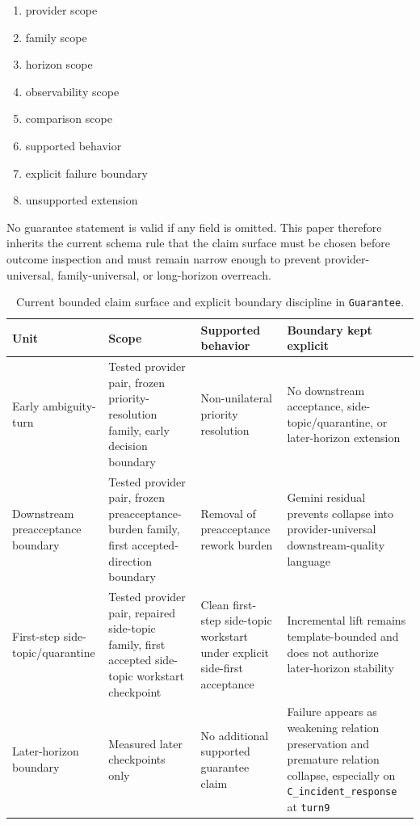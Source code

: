 \documentclass[11pt]{article}
\begin{document}
\begin{enumerate}
\item provider scope
\item family scope
\item horizon scope
\item observability scope
\item comparison scope
\item supported behavior
\item explicit failure boundary
\item unsupported extension
\end{enumerate}

No guarantee statement is valid if any field is omitted. This paper therefore
inherits the current schema rule that the claim surface must be chosen before
outcome inspection and must remain narrow enough to prevent provider-universal,
family-universal, or long-horizon overreach.

\begin{table}[ht]
\centering
\begin{tabular}{|p{}|p{}|p{}|p{}|}
\hline
\textbf{Unit} & \textbf{Scope} & \textbf{Supported behavior} & \textbf{Boundary kept explicit} \\
\hline
Early ambiguity-turn & Tested provider pair, frozen priority-resolution family, early decision boundary & Non-unilateral priority resolution & No downstream acceptance, side-topic/quarantine, or later-horizon extension \\
\hline
Downstream preacceptance boundary & Tested provider pair, frozen preacceptance-burden family, first accepted-direction boundary & Removal of preacceptance rework burden & Gemini residual prevents collapse into provider-universal downstream-quality language \\
\hline
First-step side-topic/quarantine & Tested provider pair, repaired side-topic family, first accepted side-topic workstart checkpoint & Clean first-step side-topic workstart under explicit side-first acceptance & Incremental lift remains template-bounded and does not authorize later-horizon stability \\
\hline
Later-horizon boundary & Measured later checkpoints only & No additional supported guarantee claim & Failure appears as weakening relation preservation and premature relation collapse, especially on \texttt{C\_incident\_response} at \texttt{turn9} \\
\hline
\end{tabular}
\caption{Current bounded claim surface and explicit boundary discipline in
\texttt{Guarantee}.}
\end{table}
\end{document}
